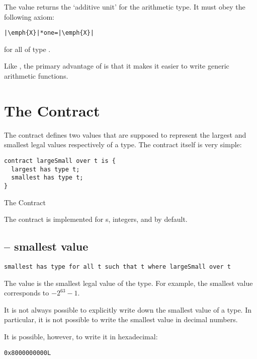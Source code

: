 The  value returns the `additive unit' for the arithmetic type.  It must obey the following axiom:

\begin{lstlisting}[escapechar=|]
|\emph{X}|*one=|\emph{X}|
\end{lstlisting}
for all  of type .

Like , the primary advantage of  is that it makes it easier to write generic arithmetic functions.

\section{The  Contract}
\label{largeSmall}
The  contract defines two values that are supposed to represent the largest and smallest legal values respectively of a type. The contract itself is very simple:
\begin{program}
\begin{lstlisting}
contract largeSmall over t is {
  largest has type t;
  smallest has type t;
}
\end{lstlisting}
\caption{The  Contract}\label{largeSmallProg}
\end{program}

The  contract is implemented for s,  integers, and  by default.

\subsection{ -- smallest value}
\begin{lstlisting}
smallest has type for all t such that t where largeSmall over t
\end{lstlisting}

The   value is the smallest legal value of the type. For example, the smallest  value corresponds to $-2^{63}-1$.

\begin{aside}
It is not always possible to explicitly write down the smallest value of a type. In particular, it is not possible to write the smallest  value in decimal numbers.
\begin{aside}
It is possible, however, to write it in hexadecimal:
\begin{lstlisting}
0x8000000000L
\end{lstlisting}
\end{aside}
\end{aside}

